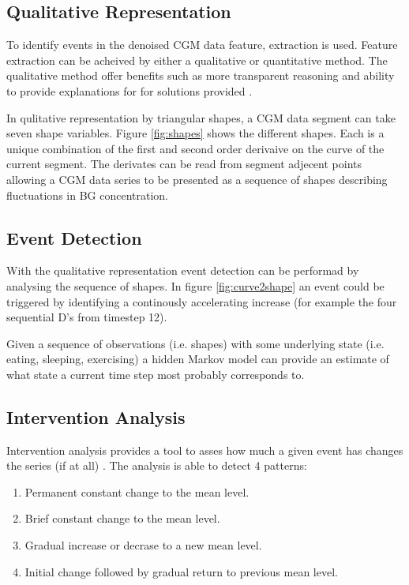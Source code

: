 

\subsection{Qualitative Representation}

To identify events in the denoised CGM data feature, extraction is used.
Feature extraction can be acheived by either a qualitative or quantitative method.
The qualitative method offer benefits such as more transparent reasoning and ability to provide explanations for for solutions provided \parencite{Ven2003}.

In qulitative representation by triangular shapes, a CGM data segment can take seven shape variables.
Figure \ref{fig:shapes} shows the different shapes.
Each is a unique combination of the first and second order derivaive on the curve of the current segment.
The derivates can be read from segment adjecent points allowing a CGM data series to be presented as a sequence of shapes describing fluctuations in BG concentration.



\subsection{Event Detection}

With the qualitative representation event detection can be performad by analysing the sequence of shapes.
In figure \ref{fig:curve2shape} an event could be triggered by identifying a continously accelerating increase (for example the four sequential D's from timestep 12).



Given a sequence of observations (i.e. shapes) with some underlying state (i.e. eating, sleeping, exercising) a hidden Markov model can provide an estimate of what state a current time step most probably corresponds to.

\subsection{Intervention Analysis}

Intervention analysis provides a tool to asses how much a given event has changes the series (if at all) \parencite{box2015time}.
The analysis is able to detect 4 patterns:

\begin{enumerate}
  \item Permanent constant change to the mean level.
  \item Brief constant change to the mean level.
  \item Gradual increase or decrase to a new mean level.
  \item Initial change followed by gradual return to previous mean level.
\end{enumerate}

